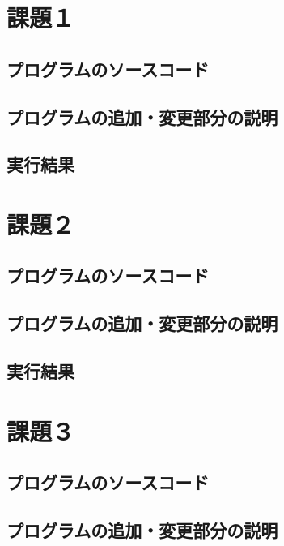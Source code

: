 \documentclass[12pt, xelatex,ja=standard,jafont=hiragino]{bxjsarticle}
\date{2026年 月 日}
\author{長谷川 瑛二}
\begin{document}
\maketitle

\section{課題１}
\subsection{プログラムのソースコード}


\subsection{プログラムの追加・変更部分の説明}


\subsection{実行結果}


\section{課題２}
\subsection{プログラムのソースコード}


\subsection{プログラムの追加・変更部分の説明}


\subsection{実行結果}





\section{課題３}
\subsection{プログラムのソースコード}


\subsection{プログラムの追加・変更部分の説明}
\end{document}
